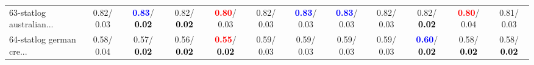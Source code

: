 \begin{table}[h]
\begin{center}
{\begin{tabular}{lc|c|c|c|c|c|c|c|c|c|c}
63-statlog australian... &   0.82/  0.03 & \textcolor{blue}{\textbf{  0.83}}/\textcolor{black}{\textbf{  0.02}} &   0.82/\textcolor{black}{\textbf{  0.02}} & \textcolor{red}{\textbf{  0.80}}/  0.03 &   0.82/  0.03 & \textcolor{blue}{\textbf{  0.83}}/  0.03 & \textcolor{blue}{\textbf{  0.83}}/  0.03 &   0.82/  0.03 &   0.82/\textcolor{black}{\textbf{  0.02}} & \textcolor{red}{\textbf{  0.80}}/  0.04 &   0.81/  0.03 \\
64-statlog german cre... &   0.58/  0.04 &   0.57/\textcolor{black}{\textbf{  0.02}} &   0.56/\textcolor{black}{\textbf{  0.02}} & \textcolor{red}{\textbf{  0.55}}/\textcolor{black}{\textbf{  0.02}} &   0.59/  0.03 &   0.59/  0.03 &   0.59/  0.03 &   0.59/  0.03 & \textcolor{blue}{\textbf{  0.60}}/\textcolor{black}{\textbf{  0.02}} &   0.58/\textcolor{black}{\textbf{  0.02}} &   0.58/\textcolor{black}{\textbf{  0.02}} \\\end{tabular}
}\label{strats1bC4.5w}
\end{center}
\end{table}
